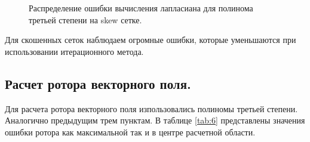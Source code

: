 \begin{figure}[H]
    \centering
    \caption{Распределение ошибки вычисления лапласиана для полинома третьей степени на skew сетке.}
    \label{fig:28}
\end{figure}


Для скошенных сеток наблюдаем огромные ошибки, которые уменьшаются при использовании итерационного метода.



\subsection{Расчет ротора векторного поля.}
Для расчета ротора векторного поля изпользовались полиномы третьей степени. Аналогично предыдущим трем пунктам. В таблице \ref{tab:6} представлены значения ошибки ротора как максимальной так и в центре расчетной области.


